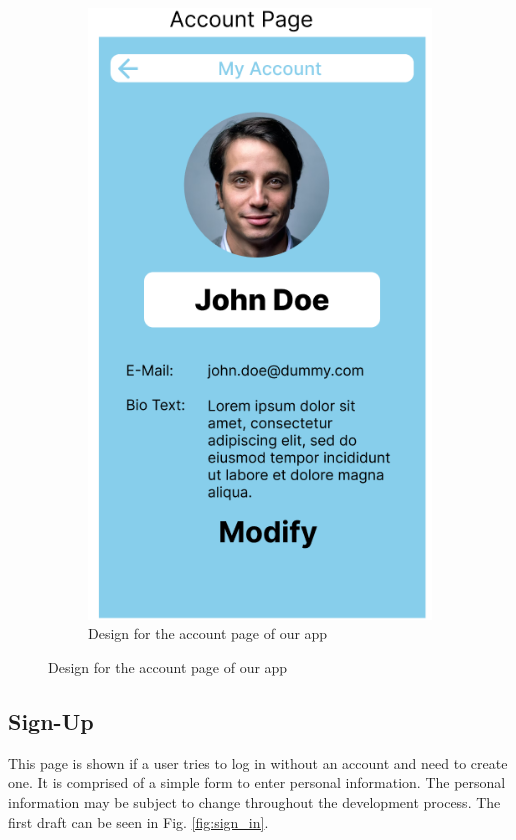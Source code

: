 \begin{figure}
\begin{subfigure}[T]{0.4\linewidth}
		\includegraphics[width=\linewidth]{figures/account.png}
		\caption{Design for the account page of our app}
		\label{fig:account}
	\end{subfigure}
\end{figure}

\subsection*{Sign-Up}
This page is shown if a user tries to log in without an account and need to create one. It is comprised of a simple form to enter personal information. The personal information may be subject to change throughout the development process. The first draft can be seen in Fig. \ref{fig:sign_in}.

